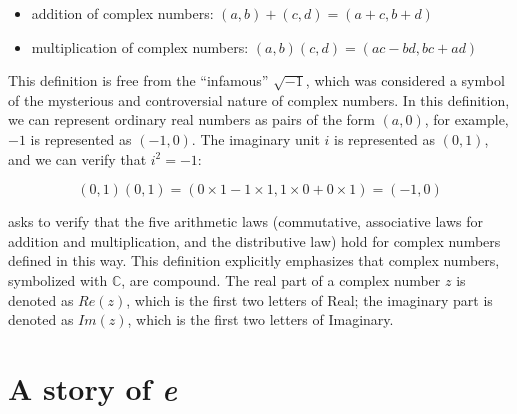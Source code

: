 \documentclass[b5paper]{article}
\begin{document}
\begin{itemize}
\item addition of complex numbers: $(a, b) + (c, d) = (a + c, b + d)$
\item multiplication of complex numbers: $(a, b) (c, d) = (ac - bd, bc + ad)$
\end{itemize}

This definition is free from the \enquote{infamous} $\sqrt{-1}$, which was considered a symbol of the mysterious and controversial nature of complex numbers. In this definition, we can represent ordinary real numbers as pairs of the form $(a, 0)$, for example, $-1$ is represented as $(-1, 0)$. The imaginary unit $i$ is represented as $(0, 1)$, and we can verify that $i^2 = -1$:

\[(0, 1)(0, 1) = (0 \times 1 - 1 \times 1, 1 \times 0 + 0 \times 1) = (-1, 0)\]

 asks to verify that the five arithmetic laws (commutative, associative laws for addition and multiplication, and the distributive law) hold for complex numbers defined in this way. This definition explicitly emphasizes that complex numbers, symbolized with $\mathbb{C}$, are compound. The real part of a complex number $z$ is denoted as $Re(z)$, which is the first two letters of Real; the imaginary part is denoted as $Im(z)$, which is the first two letters of Imaginary.


\section{A story of \textit{e}}
\end{document}
